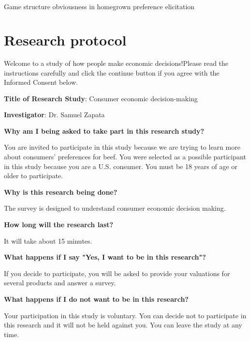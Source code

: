 \documentclass[12pt]{article}
\begin{document}
	\section*{}
	{\centering \LARGE Game structure obviousness in homegrown preference elicitation
		
		\vspace{0.5cm}
		\renewcommand*{\thefootnote}{\fnsymbol{footnote}}
		\setcounter{footnote}{0}
		
		\large
        
\section{Research protocol}

Welcome to a study of how people make economic decisions!Please read the instructions carefully and click the continue button if you agree with the Informed Consent below.

\textbf{Title of Research Study}: Consumer economic decision-making

\textbf{Investigator}: Dr. Samuel Zapata\par

\textbf{Why am I being asked to take part in this research study?}\par

You are invited to participate in this study because we are trying to learn more about consumers' preferences for beef. You were selected as a possible participant in this study because you are a U.S. consumer. You must be 18 years of age or older to participate. \par
\textbf{Why is this research being done?} \par

The survey is designed to understand consumer economic decision making. \par

\textbf{How long will the research last?} \par
It will take about 15 minutes. \par
\textbf{What happens if I say "Yes, I want to be in this research"?} \par
If you decide to participate, you will be asked to provide your valuations for several products and answer a survey. \par


\textbf{
What happens if I do not want to be in this research?} \par
Your participation in this study is voluntary. You can decide not to participate in this research and it will not be held against you. You can leave the study at any time. \par

}
\end{document}
